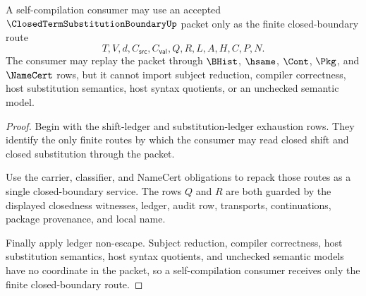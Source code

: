 \begin{theorem}
\label{thm:closed-term-substitution-boundary-self-compile-route}
A self-compilation consumer may use an accepted $\ClosedTermSubstitutionBoundaryUp$ packet only as the finite closed-boundary route
$$
T,V,d,C_{\mathsf{src}},C_{\mathsf{val}},Q,R,L,A,H,C,P,N.
$$
The consumer may replay the packet through $\BHist$, $\hsame$, $\Cont$, $\Pkg$, and $\NameCert$ rows, but it cannot import subject reduction, compiler correctness, host substitution semantics, host syntax quotients, or an unchecked semantic model.
\end{theorem}
\begin{proof}
Begin with the shift-ledger and substitution-ledger exhaustion rows. They identify the only finite routes by which the consumer may read closed shift and closed substitution through the packet.

Use the carrier, classifier, and NameCert obligations to repack those routes as a single closed-boundary service. The rows $Q$ and $R$ are both guarded by the displayed closedness witnesses, ledger, audit row, transports, continuations, package provenance, and local name.

Finally apply ledger non-escape. Subject reduction, compiler correctness, host substitution semantics, host syntax quotients, and unchecked semantic models have no coordinate in the packet, so a self-compilation consumer receives only the finite closed-boundary route.
\end{proof}

